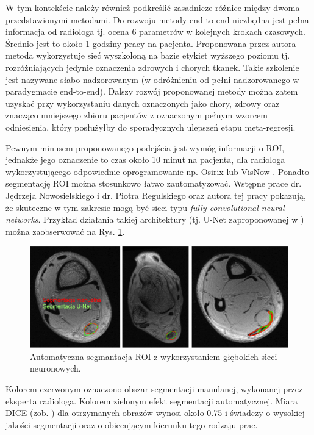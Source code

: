 W tym kontekście należy również podkreślić zasadnicze różnice między dwoma przedstawionymi metodami. Do rozwoju metody end-to-end niezbędna jest pełna informacja od radiologa tj. ocena 6 parametrów w kolejnych krokach czasowych. Średnio jest to około 1 godziny pracy na pacjenta. Proponowana przez autora metoda wykorzystuje sieć wyszkoloną na bazie etykiet wyższego poziomu tj. rozróżniających jedynie oznaczenia zdrowych i chorych tkanek. Takie szkolenie jest nazywane słabo-nadzorowanym (w odróżnieniu od pełni-nadzorowanego w paradygmacie end-to-end). Dalszy rozwój proponowanej metody można zatem uzyskać przy wykorzystaniu danych oznaczonych jako chory, zdrowy oraz znacząco mniejszego zbioru pacjentów z oznaczonym pełnym wzorcem odniesienia, który posłużyłby do sporadycznych ulepszeń etapu meta-regresji. 

Pewnym minusem proponowanego podejścia jest wymóg informacji o ROI, jednakże jego oznaczenie to czas około 10 minut na pacjenta, dla radiologa wykorzystującego odpowiednie oprogramowanie np. Osirix \cite{Rosset2004} lub VisNow \cite{Nowinski_Borucki_2014}. Ponadto segmentację ROI można stosunkowo łatwo zautomatyzować. Wstępne prace dr. Jędrzeja Nowosielskiego i dr. Piotra Regulskiego oraz autora tej pracy pokazują, że skuteczne w tym zakresie mogą być sieci typu \textit{fully convolutional neural networks}. Przykład działania takiej architektury (tj. U-Net zaproponowanej w \cite{Ronneberger2015}) można zaobserwować na Rys. \ref{fig:segmentacja}. 

\begin{figure}[h]
	\centering
	\includegraphics[width=1\textwidth]{figures/Segmentacja.png}
	\caption{Automatyczna segmantacja ROI z wykorzystaniem głębokich sieci neuronowych.}\label{fig:segmentacja}
\end{figure}
Kolorem czerwonym oznaczono obszar segmentacji manulanej, wykonanej przez eksperta radiologa. Kolorem zielonym efekt segmentacji automatycznej. Miara DICE (zob. \cite{Zou2004}) dla otrzymanych obrazów wynosi około 0.75 i świadczy o wysokiej jakości segmentacji oraz o obiecującym kierunku tego rodzaju prac.

